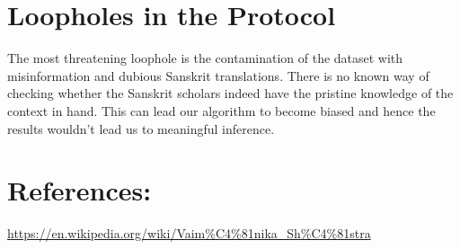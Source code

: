\documentclass{article}
\begin{document}
\section*{Loopholes in the Protocol}
The most threatening loophole is the contamination of the dataset with misinformation and dubious Sanskrit translations.
There is no known way of checking whether the Sanskrit scholars indeed have the pristine knowledge of the context in hand. This can lead our algorithm to become biased and hence the results wouldn't lead us to meaningful inference.

\section*{References:}
\url{https://en.wikipedia.org/wiki/Vaim\%C4\%81nika_Sh\%C4\%81stra}
\end{document}
